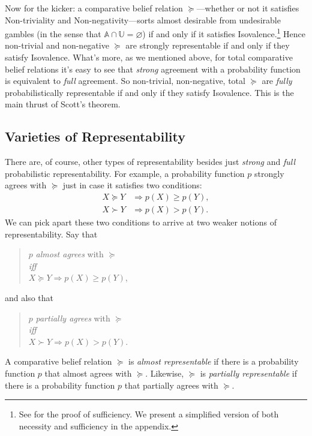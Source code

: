 Now for the kicker: a comparative belief relation $\succeq$---whether or not it satisfies Non-triviality and Non-negativity---sorts almost desirable from undesirable gambles (in the sense that $\mathbb{A}\cap\mathbb{U}=\varnothing$) if and only if it satisfies Isovalence.\footnote{See \citet[pp. 235--6]{Scott1964} for the proof of sufficiency. We present a simplified version of both necessity and sufficiency in the appendix.} Hence non-trivial and non-negative $\succeq$ are strongly representable if and only if they satisfy Isovalence. What's more, as we mentioned above, for total comparative belief relations it's easy to see that \textit{strong} agreement with a probability function is equivalent to \textit{full} agreement. So non-trivial, non-negative, total $\succeq$ are \textit{fully} probabilistically representable if and only if they satisfy Isovalence. This is the main thrust of Scott's theorem.


\subsection{Varieties of Representability}

There are, of course, other types of representability besides just \textit{strong} and \textit{full} probabilistic representability. For example, a probability function $p$ strongly agrees with $\succeq$ just in case it satisfies two conditions:
$$
\begin{aligned}
X\succeq Y &\Rightarrow p(X)\geq p(Y),\\
X \succ Y  &\Rightarrow p(X)>p(Y).
\end{aligned}
$$
We can pick apart these two conditions to arrive at two weaker notions of representability. Say that
\begin{quote}\centering
$p$ \emph{almost agrees} with $\succeq$\\
\emph{iff}\\
$X\succeq Y \Rightarrow p(X)\geq p(Y)$,
\end{quote}
and also that
\begin{quote}\centering
$p$ \emph{partially agrees} with $\succeq$\\
\emph{iff}\\
$X\succ Y \Rightarrow p(X)> p(Y)$.
\end{quote}
A comparative belief relation $\succeq$ is \emph{almost representable} if there is a probability function $p$ that almost agrees with $\succeq$. Likewise, $\succeq$ is \emph{partially representable} if there is a probability function $p$ that partially agrees with $\succeq$. 

